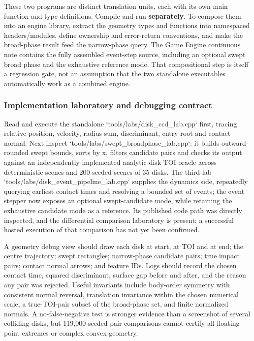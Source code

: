 These two programs are distinct translation units, each with its own main function and type definitions. Compile and run \textbf{separately}. To compose them into an engine library, extract the geometry types and functions into namespaced headers/modules, define ownership and error-return conventions, and make the broad-phase result feed the narrow-phase query. The Game Engine continuous note contains the fully assembled event-step source, including an optional swept broad phase and the exhaustive reference mode. That compositional step is itself a regression gate, not an assumption that the two standalone executables automatically work as a combined engine.

\subsubsection{Implementation laboratory and debugging contract}\label{04-visual-computing-ii-ch026-implementation-laboratory-and-debugging-contract}

\hypertarget{04-visual-computing-ii-ch026-implementation-laboratory-and-debugging-contract}{}

Read and execute the standalone `tools/labs/disk\_ccd\_lab.cpp` first, tracing relative position, velocity, radius sum, discriminant, entry root and contact normal. Next inspect `tools/labs/swept\_broadphase\_lab.cpp`: it builds outward-rounded swept bounds, sorts by x, filters candidate pairs and checks its output against an independently implemented analytic disk TOI oracle across deterministic scenes and 200 seeded scenes of 35 disks. The third lab `tools/labs/disk\_event\_pipeline\_lab.cpp` supplies the dynamics side, repeatedly querying earliest contact times and resolving a bounded set of events; the event stepper now exposes an optional swept-candidate mode, while retaining the exhaustive candidate mode as a reference. Its published code path was directly inspected, and the differential comparison laboratory is present; a successful hosted execution of that comparison has not yet been confirmed.

A geometry debug view should draw each disk at start, at TOI and at end; the centre trajectory; swept rectangles; narrow-phase candidate pairs; true impact pairs; contact normal arrows; and feature IDs. Logs should record the chosen contact time, squared discriminant, surface gap before and after, and the reason any pair was rejected. Useful invariants include body-order symmetry with consistent normal reversal, translation invariance within the chosen numerical scale, a true-TOI-pair subset of the broad-phase set, and finite normalized normals. A no-false-negative test is stronger evidence than a screenshot of several colliding disks, but 119,000 seeded pair comparisons cannot certify all floating-point extremes or complex convex geometry.

